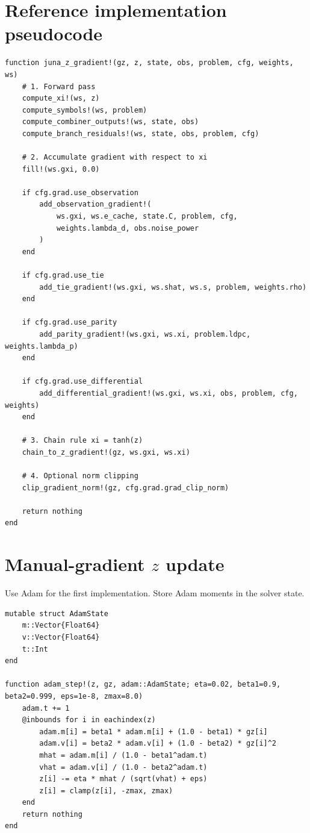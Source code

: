 \documentclass[11pt]{article}
\begin{document}
\section{Reference implementation pseudocode}

\begin{lstlisting}
function juna_z_gradient!(gz, z, state, obs, problem, cfg, weights, ws)
    # 1. Forward pass
    compute_xi!(ws, z)
    compute_symbols!(ws, problem)
    compute_combiner_outputs!(ws, state, obs)
    compute_branch_residuals!(ws, state, obs, problem, cfg)

    # 2. Accumulate gradient with respect to xi
    fill!(ws.gxi, 0.0)

    if cfg.grad.use_observation
        add_observation_gradient!(
            ws.gxi, ws.e_cache, state.C, problem, cfg,
            weights.lambda_d, obs.noise_power
        )
    end

    if cfg.grad.use_tie
        add_tie_gradient!(ws.gxi, ws.shat, ws.s, problem, weights.rho)
    end

    if cfg.grad.use_parity
        add_parity_gradient!(ws.gxi, ws.xi, problem.ldpc, weights.lambda_p)
    end

    if cfg.grad.use_differential
        add_differential_gradient!(ws.gxi, ws.xi, obs, problem, cfg, weights)
    end

    # 3. Chain rule xi = tanh(z)
    chain_to_z_gradient!(gz, ws.gxi, ws.xi)

    # 4. Optional norm clipping
    clip_gradient_norm!(gz, cfg.grad.grad_clip_norm)

    return nothing
end
\end{lstlisting}

\section{Manual-gradient $z$ update}

Use Adam for the first implementation.  Store Adam moments in the solver state.

\begin{lstlisting}
mutable struct AdamState
    m::Vector{Float64}
    v::Vector{Float64}
    t::Int
end

function adam_step!(z, gz, adam::AdamState; eta=0.02, beta1=0.9, beta2=0.999, eps=1e-8, zmax=8.0)
    adam.t += 1
    @inbounds for i in eachindex(z)
        adam.m[i] = beta1 * adam.m[i] + (1.0 - beta1) * gz[i]
        adam.v[i] = beta2 * adam.v[i] + (1.0 - beta2) * gz[i]^2
        mhat = adam.m[i] / (1.0 - beta1^adam.t)
        vhat = adam.v[i] / (1.0 - beta2^adam.t)
        z[i] -= eta * mhat / (sqrt(vhat) + eps)
        z[i] = clamp(z[i], -zmax, zmax)
    end
    return nothing
end
\end{lstlisting}
\end{document}
